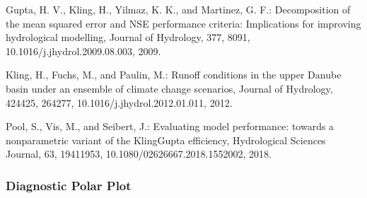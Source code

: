 \documentclass[letterpaper,10pt,english]{sphinxmanual}
\begin{document}
\begin{fulllineitems}
Gupta, H. V., Kling, H., Yilmaz, K. K., and Martinez, G. F.: Decomposition
of the mean squared error and NSE performance criteria: Implications for
improving hydrological modelling, Journal of Hydrology, 377, 80\sphinxhyphen{}91,
10.1016/j.jhydrol.2009.08.003, 2009.

Kling, H., Fuchs, M., and Paulin, M.: Runoff conditions in the upper
Danube basin under an ensemble of climate change scenarios, Journal of
Hydrology, 424\sphinxhyphen{}425, 264\sphinxhyphen{}277, 10.1016/j.jhydrol.2012.01.011, 2012.

Pool, S., Vis, M., and Seibert, J.: Evaluating model performance: towards a
non\sphinxhyphen{}parametric variant of the Kling\sphinxhyphen{}Gupta efficiency, Hydrological Sciences
Journal, 63, 1941\sphinxhyphen{}1953, 10.1080/02626667.2018.1552002, 2018.

\end{fulllineitems}



\subsubsection{Diagnostic Polar Plot}
\label{\detokenize{reference/kge:diagnostic-polar-plot}}
\end{document}
